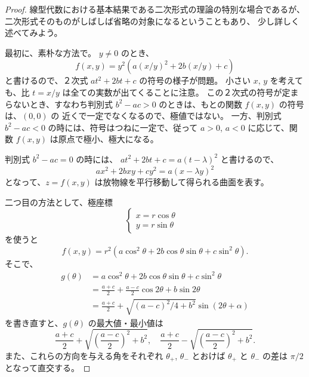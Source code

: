 \documentclass[a4paper]{jsarticle}
\theoremstyle{definition}
\theoremstyle{remark}
\begin{document}
\begin{proof} 線型代数における基本結果である二次形式の理論の特別な場合であるが、
二次形式そのものがしばしば省略の対象になるということもあり、
少し詳しく述べてみよう。

最初に、素朴な方法で。
$y \not= 0$ のとき、
\[
f(x,y) = y^2(a(x/y)^2 + 2b(x/y) + c)
\]
と書けるので、２次式 $at^2 + 2bt + c$ の符号の様子が問題。
小さい $x$, $y$ を考えても、比 $t=x/y$ は全ての実数が出てくることに注意。
この２次式の符号が定まらないとき、すなわち判別式
$b^2-ac>0$ のときは、もとの関数 $f(x,y)$ の符号は、$(0,0)$ の
近くで一定でなくなるので、極値ではない。
一方、判別式 $b^2 - ac <0$ の時には、符号はつねに一定で、従って
$a>0$, $a<0$ に応じて、関数 $f(x,y)$ は原点で極小、極大になる。

判別式 $b^2 - ac = 0$ の時には、
$at^2 + 2bt + c = a(t - \lambda)^2$ と書けるので、
\[
ax^2 + 2bxy + cy^2 = a(x - \lambda y)^2
\]
となって、$z=f(x,y)$ は放物線を平行移動して得られる曲面を表す。

二つ目の方法として、極座標
\[
\begin{cases}
x = r\cos\theta &\\
y = r\sin\theta &
\end{cases}
\]
を使うと
\[
f(x,y) = r^2(a\cos^2\theta + 2b\cos\theta\sin\theta + c\sin^2\theta).
\]
そこで、
\begin{align*}
g(\theta) &= a\cos^2\theta + 2b\cos\theta\sin\theta + c\sin^2\theta\\
&= \frac{a+c}{2} + \frac{a-c}{2}\cos 2\theta + b\sin 2\theta\\
&= \frac{a+c}{2} + \sqrt{(a-c)^2/4 + b^2}\sin (2\theta + \alpha)
\end{align*}
を書き直すと、$g(\theta)$ の最大値・最小値は
\[
\frac{a+c}{2} + \sqrt{\left(\frac{a-c}{2}\right)^2 + b^2},\quad
\frac{a+c}{2} - \sqrt{\left(\frac{a-c}{2}\right)^2 + b^2}.
\]
また、これらの方向を与える角をそれぞれ $\theta_+$, $\theta_-$ とおけば
$\theta_+$ と $\theta_-$ の差は $\pi/2$ となって直交する。


\end{proof}
\end{document}
